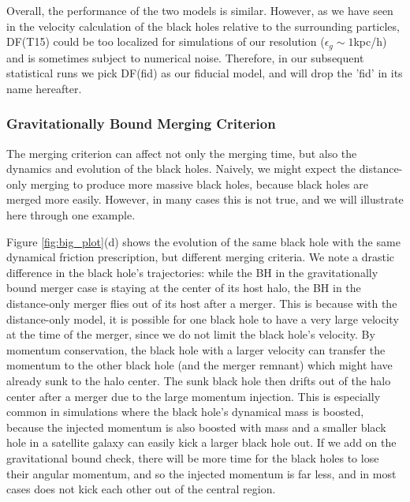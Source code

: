 Overall, the performance of the two models is similar. However, as we have seen in the velocity calculation of the black holes relative to the surrounding particles, DF(T15) could be too localized for simulations of our resolution ($\epsilon_g \sim 1$kpc/h) and is sometimes subject to numerical noise. Therefore, in our subsequent statistical runs we pick DF(fid) as our fiducial model, and will drop the 'fid' in its name hereafter.


\subsubsection{Gravitationally Bound Merging Criterion}
\label{subsec:bound_check}

The merging criterion can affect not only the merging time, but also the dynamics and evolution of the black holes. Naively, we might expect the distance-only merging to produce more massive black holes, because black holes are merged more easily. However, in many cases this is not true, and we will illustrate here through one example. 

Figure \ref{fig:big_plot}(d) shows the evolution of the same black hole with the same dynamical friction prescription, but different merging criteria. We note a drastic difference in the black hole's trajectories: while the BH in the gravitationally bound merger case is staying at the center of its host halo, the BH in the distance-only merger flies out of its host after a merger. This is because with the distance-only model, it is possible for one black hole to have a very large velocity at the time of the merger, since we do not limit the black hole's velocity. By momentum conservation, the black hole with a larger velocity can transfer the momentum to the other black hole (and the merger remnant) which might have already sunk to the halo center. The sunk black hole then drifts out of the halo center after a merger due to the large momentum injection. This is especially common in simulations where the black hole's dynamical mass is boosted, because the injected momentum is also boosted with mass and a smaller black hole in a satellite galaxy can easily kick a larger black hole out. If we add on the gravitational bound check, there will be more time for the black holes to lose their angular momentum, and so the injected momentum is far less, and in most cases does not kick each other out of the central region.






